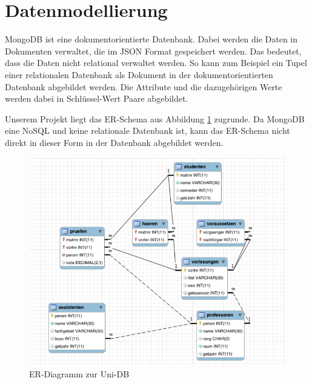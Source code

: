\section{Datenmodellierung}
\label{kap:ERDiagramm}
MongoDB ist eine dokumentorientierte Datenbank. Dabei werden die Daten in Dokumenten verwaltet, die im JSON Format gespeichert werden. Das bedeutet, dass die Daten nicht relational
verwaltet werden. So kann zum Beispiel ein Tupel einer relationalen Datenbank
als Dokument in der dokumentorientierten Datenbank abgebildet werden. Die
Attribute und die dazugehörigen Werte werden dabei in Schlüssel-Wert Paare
abgebildet. 

Unserem Projekt liegt das ER-Schema aus Abbildung \ref{fig:uni-db}
zugrunde.
Da MongoDB eine NoSQL und keine relationale Datenbank ist, kann das ER-Schema nicht direkt
in dieser Form in der Datenbank abgebildet werden. 

\begin{figure}[h] 
	\centering
		\includegraphics[width=1\textwidth]{./pictures/SQL-DB_ER_Diagramm_UNI-DB.png}
	\caption{ER-Diagramm zur Uni-DB \cite{Kaufmann2016}}
	\label{fig:uni-db}
\end{figure}

